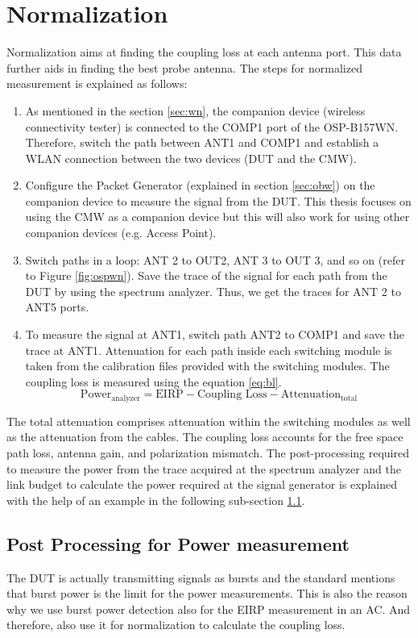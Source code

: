 \section{Normalization} \label{sec:11}
Normalization aims at finding the coupling loss at each antenna port. This data further aids in finding the best probe antenna. The steps for normalized measurement is explained as follows:
\begin{enumerate}
\item As mentioned in the section \ref{sec:wn}, the companion device (wireless connectivity tester) is connected to the COMP1 port of the OSP-B157WN. Therefore, switch the path between ANT1 and COMP1 and establish a \acs{WLAN} connection between the two devices (\acs{DUT} and the \acs{CMW}). 
\item Configure the Packet Generator (explained in section \ref{sec:obw}) on the companion device to measure the signal from the \acs{DUT}. This thesis focuses on using the CMW as a companion device but this will also work for using other companion devices (e.g. Access Point).
\item Switch paths in a loop: ANT 2 to OUT2, ANT 3 to OUT 3, and so on (refer to Figure \ref{fig:ospwn}). Save the trace of the signal for each path from the \acs{DUT} by using the spectrum analyzer. Thus, we get the traces for ANT 2 to ANT5 ports.
\item To measure the signal at ANT1, switch path ANT2 to COMP1 and save the trace at ANT1. Attenuation for each path inside each switching module is taken from the calibration files provided with the switching modules. The coupling loss is measured using the equation \ref{eq:bl}.
\begin{equation}
\mbox{Power}_{\mbox{analyzer}}  = \mbox{EIRP} - \mbox{Coupling Loss} - \mbox{Attenuation}_{\mbox{total}}  \label{eq:bl}
\end{equation}
\end{enumerate}
The total attenuation comprises attenuation within the switching modules as well as the attenuation from the cables. The coupling loss accounts for the free space path loss, antenna gain, and polarization mismatch. The post-processing required to measure the power from the trace acquired at the spectrum analyzer and the link budget to calculate the power required at the signal generator is explained with the help of an example in the following sub-section \ref{sec:abc}.

\subsection{Post Processing for Power measurement} \label{sec:abc}
The \acs{DUT} is actually transmitting signals as bursts and the standard mentions that burst power is the limit for the power measurements. This is also the reason why we use burst power detection also for the \acs{EIRP} measurement in an \acf{AC}. And therefore, also use it for normalization to calculate the coupling loss. \\

